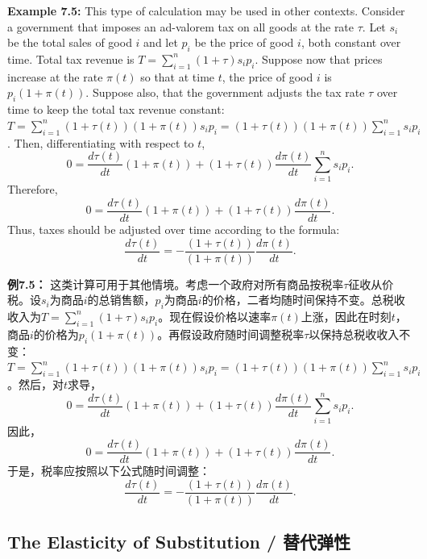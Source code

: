 \begin{original}
\textbf{Example 7.5:} This type of calculation may be used in other contexts. Consider a government that imposes an ad-valorem tax on all goods at the rate $\tau$. Let $s_i$ be the total sales of good $i$ and let $p_i$ be the price of good $i$, both constant over time. Total tax revenue is $T = \sum_{i=1}^{n} (1+\tau) s_i p_i$. Suppose now that prices increase at the rate $\pi(t)$ so that at time $t$, the price of good $i$ is $p_i(1 + \pi(t))$. Suppose also, that the government adjusts the tax rate $\tau$ over time to keep the total tax revenue constant: $T = \sum_{i=1}^{n} (1+\tau(t))(1+\pi(t)) s_i p_i = (1+\tau(t))(1+\pi(t)) \sum_{i=1}^{n} s_i p_i$. Then, differentiating with respect to $t$,
\[
0 = \frac{d\tau(t)}{dt} (1+\pi(t)) + (1+\tau(t)) \frac{d\pi(t)}{dt} \sum_{i=1}^{n} s_i p_i.
\]
Therefore,
\[
0 = \frac{d\tau(t)}{dt} (1+\pi(t)) + (1+\tau(t)) \frac{d\pi(t)}{dt}.
\]
Thus, taxes should be adjusted over time according to the formula:
\[
\frac{d\tau(t)}{dt} = -\frac{(1+\tau(t))}{(1+\pi(t))} \frac{d\pi(t)}{dt}.
\]
\end{original}
\begin{translation}
\textbf{例7.5：} 这类计算可用于其他情境。考虑一个政府对所有商品按税率$\tau$征收从价税。设$s_i$为商品$i$的总销售额，$p_i$为商品$i$的价格，二者均随时间保持不变。总税收收入为$T = \sum_{i=1}^{n} (1+\tau) s_i p_i$。现在假设价格以速率$\pi(t)$上涨，因此在时刻$t$，商品$i$的价格为$p_i(1 + \pi(t))$。再假设政府随时间调整税率$\tau$以保持总税收收入不变：$T = \sum_{i=1}^{n} (1+\tau(t))(1+\pi(t)) s_i p_i = (1+\tau(t))(1+\pi(t)) \sum_{i=1}^{n} s_i p_i$。然后，对$t$求导，
\[
0 = \frac{d\tau(t)}{dt} (1+\pi(t)) + (1+\tau(t)) \frac{d\pi(t)}{dt} \sum_{i=1}^{n} s_i p_i.
\]
因此，
\[
0 = \frac{d\tau(t)}{dt} (1+\pi(t)) + (1+\tau(t)) \frac{d\pi(t)}{dt}.
\]
于是，税率应按照以下公式随时间调整：
\[
\frac{d\tau(t)}{dt} = -\frac{(1+\tau(t))}{(1+\pi(t))} \frac{d\pi(t)}{dt}.
\]
\end{translation}

\subsection{The Elasticity of Substitution / 替代弹性}

